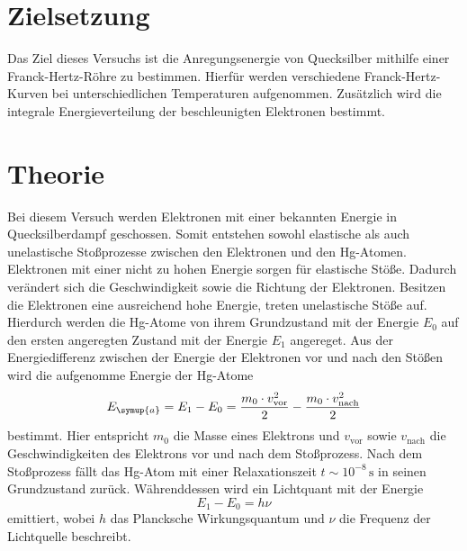 \nocite{anleitungV601}
\section{Zielsetzung}
\label{sec:Zielsetzung}
Das Ziel dieses Versuchs ist die Anregungsenergie von Quecksilber mithilfe einer Franck-Hertz-Röhre zu bestimmen. Hierfür werden
verschiedene Franck-Hertz-Kurven bei unterschiedlichen Temperaturen aufgenommen. Zusätzlich wird die integrale Energieverteilung der
beschleunigten Elektronen bestimmt.
\section{Theorie}
\label{sec:Theorie}
Bei diesem Versuch werden Elektronen mit einer bekannten Energie in Quecksilberdampf geschossen. Somit entstehen sowohl elastische als auch unelastische
Stoßprozesse zwischen den Elektronen und den Hg-Atomen. Elektronen mit einer nicht zu hohen Energie sorgen für elastische Stöße. Dadurch verändert sich die
Geschwindigkeit sowie die Richtung der Elektronen. Besitzen die Elektronen eine ausreichend hohe Energie, treten unelastische Stöße auf. Hierdurch werden die Hg-Atome
von ihrem Grundzustand mit der Energie $E_0$ auf den ersten angeregten Zustand mit der Energie $E_1$ angereget. Aus der Energiedifferenz zwischen der Energie der Elektronen 
vor und nach den Stößen wird die aufgenomme Energie der Hg-Atome
\begin{equation}
    E_{\symup{a}}=E_1 - E_0 =\frac{m_0\cdot v_{\text{vor}}^2}{2} - \frac{m_0\cdot v_{\text{nach}}^2}{2}
    \label{eqn:Energiedifferenz}
\end{equation}
bestimmt. Hier entspricht $m_0$ die Masse eines Elektrons und $v_{\text{vor}}$ sowie $v_{\text{nach}}$ die Geschwindigkeiten des Elektrons vor und nach dem Stoßprozess.
Nach dem Stoßprozess fällt das Hg-Atom mit einer Relaxationszeit $t \sim 10^{-8}\,\unit{\second}$ in seinen Grundzustand zurück. Währenddessen wird ein Lichtquant
mit der Energie 
\begin{equation}
  E_1 - E_0 = h \nu
  \label{eqn:EnergieLichtquants}
\end{equation}
emittiert, wobei $h$ das Plancksche Wirkungsquantum und $\nu$ die Frequenz der Lichtquelle beschreibt.
